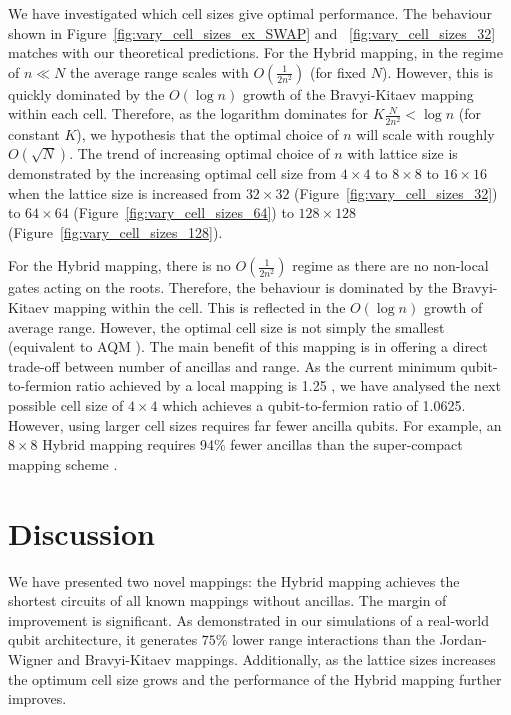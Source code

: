 We have investigated which cell sizes give optimal performance. The behaviour shown in Figure~\ref{fig:vary_cell_sizes_ex_SWAP} and ~\ref{fig:vary_cell_sizes_32} matches with our theoretical predictions. For the Hybrid mapping, in the regime of $n \ll N$ the average range scales with $O(\frac{1}{2n^2})$ (for fixed $N$). However, this is quickly dominated by the $O(\log n)$ growth of the Bravyi-Kitaev mapping within each cell. Therefore, as the logarithm dominates for $K\frac{N}{2n^2} < \log n$ (for constant $K$), we hypothesis that the optimal choice of $n$ will scale with roughly $O(\sqrt{N})$. The trend of increasing optimal choice of $n$ with lattice size is demonstrated by the increasing optimal cell size from $4\times 4$ to $8\times 8$ to $16 \times 16$ when the lattice size is increased from $32 \times 32$ (Figure~\ref{fig:vary_cell_sizes_32}) to $64 \times 64$ (Figure~\ref{fig:vary_cell_sizes_64}) to $128 \times 128$ (Figure~\ref{fig:vary_cell_sizes_128}).

For the Hybrid\+ mapping, there is no $O(\frac{1}{2n^2})$ regime as there are no non-local gates acting on the roots. Therefore, the behaviour is dominated by the Bravyi-Kitaev mapping within the cell. This is reflected in the $O(\log n)$ growth of average range. However, the optimal cell size is not simply the smallest (equivalent to AQM \cite{steudtner2019quantum}). The main benefit of this mapping is in offering a direct trade-off between number of ancillas and range. As the current minimum qubit-to-fermion ratio achieved by a local mapping is 1.25 \cite{chen2022equivalence}, we have analysed the next possible cell size of $4 \times 4$ which achieves a qubit-to-fermion ratio of 1.0625. However, using larger cell sizes requires far fewer ancilla qubits. For example, an $8 \times 8$ Hybrid\+ mapping requires 94\% fewer ancillas than the super-compact mapping scheme \cite{chen2022equivalence}.

\section{Discussion}
We have presented two novel mappings: the Hybrid mapping achieves the shortest circuits of all known mappings without ancillas. The margin of improvement is significant. As demonstrated in our simulations of a real-world qubit architecture, it generates $75\%$ lower range interactions than the Jordan-Wigner and Bravyi-Kitaev mappings. Additionally, as the lattice sizes increases the optimum cell size grows and the performance of the Hybrid mapping further improves.

